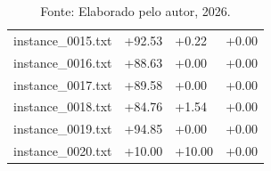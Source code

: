 \begin{table}[H]
\begin{minipage}{\textwidth}
{\begin{tabular}{l | l | l | l}
        instance\_0015.txt & \textcolor{green!50!black}{+92.53} & \textcolor{green!50!black}{+0.22} & +0.00 \\
        \rowcolor{gray!20} instance\_0016.txt & \textcolor{green!50!black}{+88.63} & +0.00 & +0.00 \\
        instance\_0017.txt & \textcolor{green!50!black}{+89.58} & +0.00 & +0.00 \\
        \rowcolor{gray!20} instance\_0018.txt & \textcolor{green!50!black}{+84.76} & \textcolor{green!50!black}{+1.54} & +0.00 \\
        instance\_0019.txt & \textcolor{green!50!black}{+94.85} & +0.00 & +0.00 \\
        \rowcolor{gray!20} instance\_0020.txt & \textcolor{green!50!black}{+10.00} & \textcolor{green!50!black}{+10.00} & +0.00 \\
        \hline
      \end{tabular}
    }
    \caption*{\footnotesize Fonte: Elaborado pelo autor, 2026.}
  \end{minipage}
\end{table}

